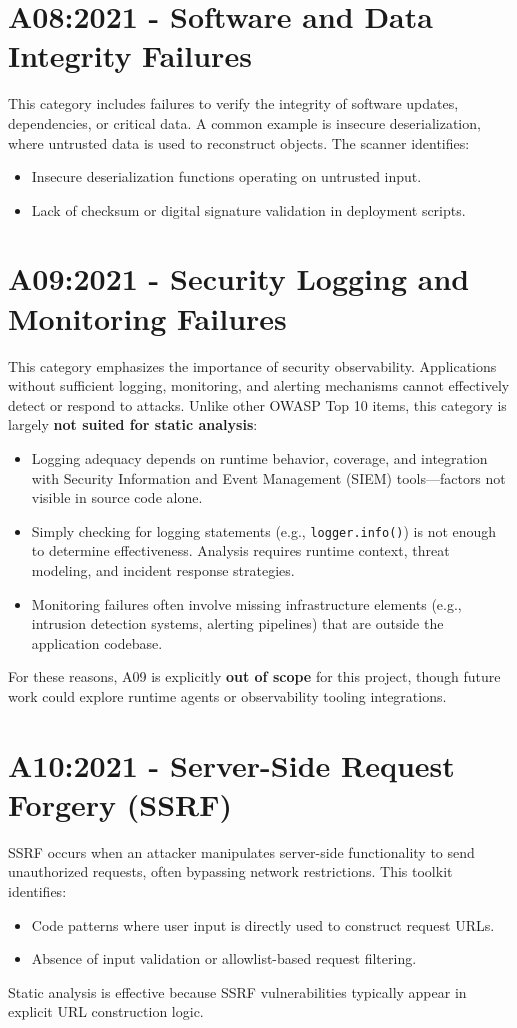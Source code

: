 \section{A08:2021 - Software and Data Integrity Failures}
This category includes failures to verify the integrity of software updates, dependencies, or critical data. A common example is insecure deserialization, where untrusted data is used to reconstruct objects.
The scanner identifies:
\begin{itemize}
    \item Insecure deserialization functions operating on untrusted input.
    \item Lack of checksum or digital signature validation in deployment scripts.
\end{itemize}

\section{A09:2021 - Security Logging and Monitoring Failures}
This category emphasizes the importance of security observability. Applications without sufficient logging, monitoring, and alerting mechanisms cannot effectively detect or respond to attacks.
Unlike other OWASP Top 10 items, this category is largely \textbf{not suited for static analysis}:
\begin{itemize}
    \item Logging adequacy depends on runtime behavior, coverage, and integration with Security Information and Event Management (SIEM) tools—factors not visible in source code alone.
    \item Simply checking for logging statements (e.g., \texttt{logger.info()}) is not enough to determine effectiveness. Analysis requires runtime context, threat modeling, and incident response strategies.
    \item Monitoring failures often involve missing infrastructure elements (e.g., intrusion detection systems, alerting pipelines) that are outside the application codebase.
\end{itemize}
For these reasons, A09 is explicitly \textbf{out of scope} for this project, though future work could explore runtime agents or observability tooling integrations.

\section{A10:2021 - Server-Side Request Forgery (SSRF)}
SSRF occurs when an attacker manipulates server-side functionality to send unauthorized requests, often bypassing network restrictions.
This toolkit identifies:
\begin{itemize}
    \item Code patterns where user input is directly used to construct request URLs.
    \item Absence of input validation or allowlist-based request filtering.
\end{itemize}
Static analysis is effective because SSRF vulnerabilities typically appear in explicit URL construction logic.
